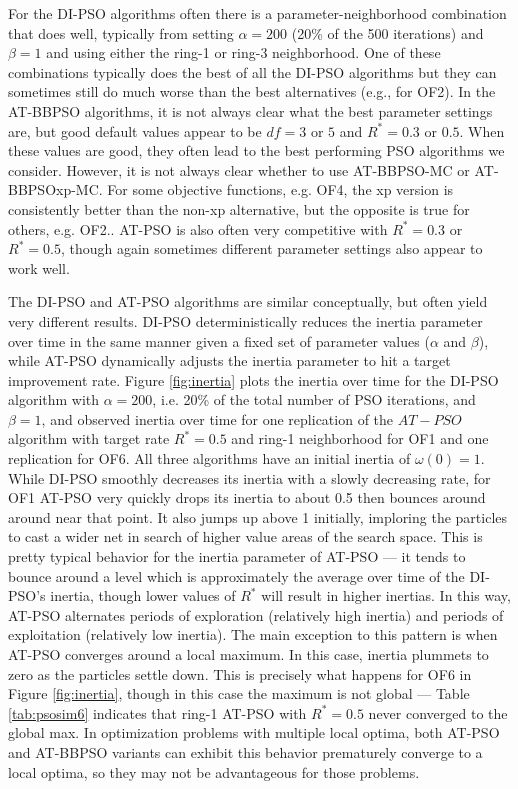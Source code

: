 \documentclass[12pt]{article}
\begin{document}
For the DI-PSO algorithms often there is a parameter-neighborhood combination that does well, typically from setting $\alpha=200$ (20\% of the 500 iterations) and $\beta=1$ and using either the ring-1 or ring-3 neighborhood. One of these combinations typically does the best of all the DI-PSO algorithms but they can sometimes still do much worse than the best alternatives (e.g., for OF2). In the AT-BBPSO algorithms, it is not always clear what the best parameter settings are, but good default values appear to be $df=3$ or $5$ and $R^*=0.3$ or $0.5$. When these values are good, they often lead to the best performing PSO algorithms we consider. However, it is not always clear whether to use AT-BBPSO-MC or AT-BBPSOxp-MC. For some objective functions, e.g. OF4, the xp version is consistently better than the non-xp alternative, but the opposite is true for others, e.g. OF2.. AT-PSO is also often very competitive with $R^*=0.3$ or $R^*=0.5$, though again sometimes different parameter settings also appear to work well. 

The DI-PSO and AT-PSO algorithms are similar conceptually, but often yield very different results. DI-PSO deterministically reduces the inertia parameter over time in the same manner given a fixed set of parameter values ($\alpha$ and $\beta$), while AT-PSO dynamically adjusts the inertia parameter to hit a target improvement rate. Figure \ref{fig:inertia} plots the inertia over time for the DI-PSO algorithm with $\alpha=200$, i.e. 20\% of the total number of PSO iterations, and $\beta=1$, and observed inertia over time for one replication of the $AT-PSO$ algorithm with target rate $R^*=0.5$ and ring-1 neighborhood for OF1 and one replication for OF6. All three algorithms have an initial inertia of $\omega(0)=1$. While DI-PSO smoothly decreases its inertia with a slowly decreasing rate, for OF1 AT-PSO very quickly drops its inertia to about 0.5 then bounces around around near that point. It also jumps up above 1 initially, imploring the particles to cast a wider net in search of higher value areas of the search space. This is pretty typical behavior for the inertia parameter of AT-PSO --- it tends to bounce around a level which is approximately the average over time of the DI-PSO's inertia, though lower values of $R^*$ will result in higher inertias. In this way, AT-PSO alternates periods of exploration (relatively high inertia) and periods of exploitation (relatively low inertia). The main exception to this pattern is when AT-PSO converges around a local maximum. In this case, inertia plummets to zero as the particles settle down. This is precisely what happens for OF6 in Figure \ref{fig:inertia}, though in this case the maximum is not global --- Table \ref{tab:psosim6} indicates that ring-1 AT-PSO with $R^*=0.5$ never converged to the global max. In optimization problems with multiple local optima, both AT-PSO and AT-BBPSO variants can exhibit this behavior prematurely converge to a local optima, so they may not be advantageous for those problems. 
\end{document}
